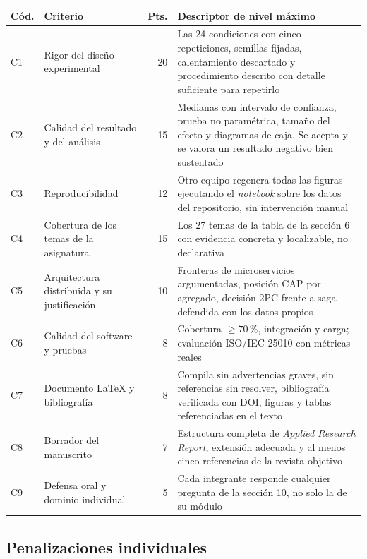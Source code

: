 \documentclass[11pt,a4paper]{article}
\begin{document}
\begin{center}
	\small
	\begin{longtable}{@{}p{0.9cm}p{5.6cm}rp{6.6cm}@{}}
		\toprule
		\textbf{Cód.} & \textbf{Criterio} & \textbf{Pts.} & \textbf{Descriptor de nivel máximo} \\
		\midrule
		\endhead
		C1 & Rigor del diseño experimental & 20 & Las 24 condiciones con cinco repeticiones, semillas fijadas, calentamiento descartado y procedimiento descrito con detalle suficiente para repetirlo \\
		\addlinespace
		C2 & Calidad del resultado y del análisis & 15 & Medianas con intervalo de confianza, prueba no paramétrica, tamaño del efecto y diagramas de caja. Se acepta y se valora un resultado negativo bien sustentado \\
		\addlinespace
		C3 & Reproducibilidad & 12 & Otro equipo regenera todas las figuras ejecutando el \emph{notebook} sobre los datos del repositorio, sin intervención manual \\
		\addlinespace
		C4 & Cobertura de los temas de la asignatura & 15 & Los 27 temas de la tabla de la sección 6 con evidencia concreta y localizable, no declarativa \\
		\addlinespace
		C5 & Arquitectura distribuida y su justificación & 10 & Fronteras de microservicios argumentadas, posición CAP por agregado, decisión 2PC frente a saga defendida con los datos propios \\
		\addlinespace
		C6 & Calidad del software y pruebas & 8 & Cobertura $\geq 70\,\%$, integración y carga; evaluación ISO/IEC 25010 con métricas reales \\
		\addlinespace
		C7 & Documento LaTeX y bibliografía & 8 & Compila sin advertencias graves, sin referencias sin resolver, bibliografía verificada con DOI, figuras y tablas referenciadas en el texto \\
		\addlinespace
		C8 & Borrador del manuscrito & 7 & Estructura completa de \emph{Applied Research Report}, extensión adecuada y al menos cinco referencias de la revista objetivo \\
		\addlinespace
		C9 & Defensa oral y dominio individual & 5 & Cada integrante responde cualquier pregunta de la sección 10, no solo la de su módulo \\
		\bottomrule
	\end{longtable}
\end{center}

\subsection{Penalizaciones individuales}
\end{document}
